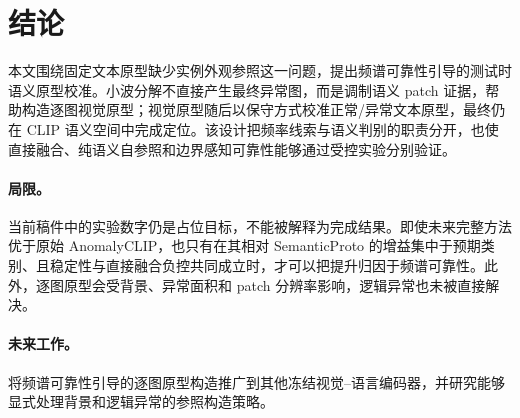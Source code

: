 \section{结论}
\label{sec:conclusion}

本文围绕固定文本原型缺少实例外观参照这一问题，提出频谱可靠性引导的测试时语义原型校准。小波分解不直接产生最终异常图，而是调制语义 patch 证据，帮助构造逐图视觉原型；视觉原型随后以保守方式校准正常/异常文本原型，最终仍在 CLIP 语义空间中完成定位。该设计把频率线索与语义判别的职责分开，也使直接融合、纯语义自参照和边界感知可靠性能够通过受控实验分别验证。

\paragraph{局限。}
当前稿件中的实验数字仍是占位目标，不能被解释为完成结果。即使未来完整方法优于原始 AnomalyCLIP，也只有在其相对 SemanticProto 的增益集中于预期类别、且稳定性与直接融合负控共同成立时，才可以把提升归因于频谱可靠性。此外，逐图原型会受背景、异常面积和 patch 分辨率影响，逻辑异常也未被直接解决。

\paragraph{未来工作。}
将频谱可靠性引导的逐图原型构造推广到其他冻结视觉--语言编码器，并研究能够显式处理背景和逻辑异常的参照构造策略。
